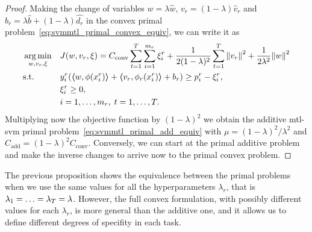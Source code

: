 \begin{proof}
    Making the change of variables $w = \lambda \hat{w}$, $v_r = (1 - \lambda) \hat{v}_r$ and $b_r = \lambda \hat{b} + (1 - \lambda) \hat{d_r}$ in the convex primal problem~\eqref{eq:svmmtl_primal_convex_equiv}, we can write it as 
        \begin{equation*}
            \begin{aligned}
            & \operatorname*{arg\min}_{w, v_r, \xi}
            & & {J(w, v_r, \xi) = C_\text{conv} \sum_{t= 1}^T \sum_{i=1}^{m_r}{\xi_{i}^r} + \frac{1}{2 (1-\lambda)^2} \sum_{t= 1}^T{\left\lVert v_r\right\rVert^2} + \frac{1}{2 \lambda^2} {\left\lVert w\right\rVert}^2} \\
            & \text{s.t.}
            & & y_{i}^r (\bm{\left\langle} w, \phi(x_{i}^r) \bm{\right\rangle}  + \bm{\left\langle} v_r, \phi_r(x_{i}^r) \bm{\right\rangle} + b_r) \geq p_{i}^r - \xi_{i}^r , \\
            & & & \xi_{i}^r \geq 0,  \\
            & & & i=1,\dotsc,m_r, \;  t= 1,\dotsc,T .
            \end{aligned}
        \end{equation*}
    Multiplying now the objective function by $(1 - \lambda)^2$ we obtain the additive \acrshort{mtl}-\acrshort{svm} primal problem~\eqref{eq:svmmtl_primal_add_equiv} with $\mu =(1 - \lambda)^2 / \lambda^2$ and $C_\text{add} = (1-\lambda)^2 C_\text{conv}$.
    Conversely, we can start at the primal additive problem and make the inverse changes to arrive now to the primal convex problem.
\end{proof}

The previous proposition shows the equivalence between the primal problems when we use the same values for all the hyperparameters $\lambda_r$, that is $\lambda_1 = \ldots = \lambda_T = \lambda$.
However, the full convex formulation, with possibly different values for each $\lambda_r$, is more general than the additive one, and it allows us to define different degrees of specifity in each task.


